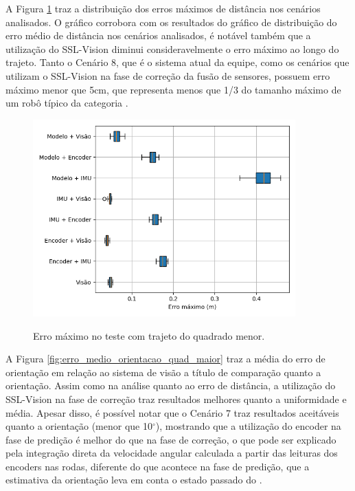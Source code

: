 \documentclass[acronym, symbols, table]{fei}
\begin{document}
		A Figura \ref{fig:erro_maximo_distancia_quad_maior} traz a distribuição dos erros máximos de distância nos cenários analisados. O gráfico corrobora com os resultados do gráfico de distribuição do erro médio de distância nos cenários analisados, é notável também que a utilização do SSL-Vision diminui consideravelmente o erro máximo ao longo do trajeto. Tanto o Cenário 8, que é o sistema atual da equipe, como os cenários que utilizam o SSL-Vision na fase de correção da fusão de sensores, possuem erro máximo menor que 5cm, que representa menos que 1/3 do tamanho máximo de um robô típico da categoria . %
		
		\begin{figure}[!htb]
			\centering
			\caption{Erro máximo no teste com trajeto do quadrado menor.}
			\includegraphics[width=0.9\textwidth]{../Dados/Graficos-Resultados/erro_maximo_distancia_quadrado_maior.png}
			\label{fig:erro_maximo_distancia_quad_maior}
		\end{figure}
	
		A Figura \ref{fig:erro_medio_orientacao_quad_maior} traz a média do erro de orientação em relação ao sistema de visão a título de comparação quanto a orientação. Assim como na análise quanto ao erro de distância, a utilização do SSL-Vision na fase de correção traz resultados melhores quanto a uniformidade e média. Apesar disso, é possível notar que o Cenário 7 traz resultados aceitáveis quanto a orientação (menor que 10$^\circ$), mostrando que a utilização do encoder na fase de predição é melhor do que na fase de correção, o que pode ser explicado pela integração direta da velocidade angular calculada a partir das leituras dos encoders nas rodas, diferente do que acontece na fase de predição, que a estimativa da orientação leva em conta o estado passado do .
		
\end{document}
